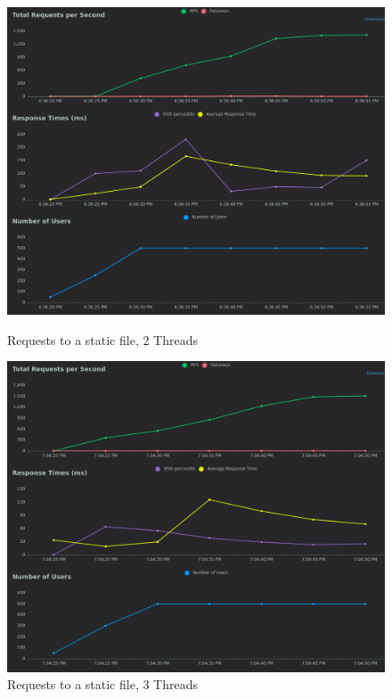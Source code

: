 \begin{figure}[h]
    \centering
    \begin{minipage}{0.45\textwidth}
        \centering
        \includegraphics[width=\textwidth]{figures/2threads.png}
        \caption{Requests to a static file, 2 Threads}
    \end{minipage}
    \hfill
    \begin{minipage}{0.45\textwidth}
        \centering
        \includegraphics[width=\textwidth]{figures/3threads.png}
        \caption{Requests to a static file, 3 Threads}
    \end{minipage}
\end{figure}

